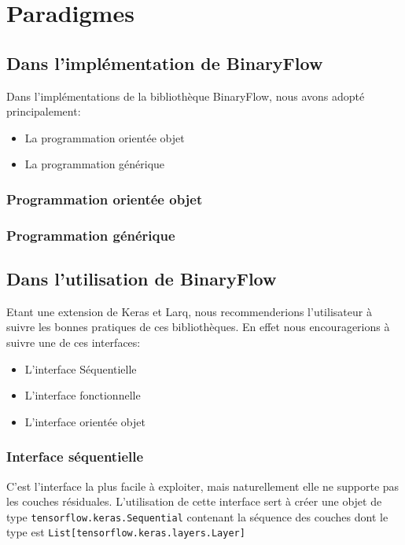 \section{Paradigmes}
\subsection{Dans l'implémentation de BinaryFlow}\label{Paradigm:Implementation}
Dans l'implémentations de la bibliothèque BinaryFlow, nous avons adopté principalement:
\begin{itemize}
	\item La programmation orientée objet
	\item La programmation générique
\end{itemize}
\subsubsection{Programmation orientée objet}

\subsubsection{Programmation générique}

\subsection{Dans l'utilisation de BinaryFlow}\label{Paradigm:User}
Etant une extension de Keras et Larq, nous recommenderions l'utilisateur à suivre les bonnes pratiques de ces bibliothèques.
\newline En effet nous encouragerions à suivre une de ces interfaces:
\begin{itemize}
	\item L'interface Séquentielle
	\item L'interface fonctionnelle
	\item L'interface orientée objet
\end{itemize}
\subsubsection{Interface séquentielle}
C'est l'interface la plus facile à exploiter, mais naturellement elle ne supporte pas les couches résiduales.
\newline L'utilisation de cette interface sert à créer une objet de type \texttt{tensorflow.keras.Sequential} contenant la séquence des couches dont le type est \texttt{List[tensorflow.keras.layers.Layer]}


